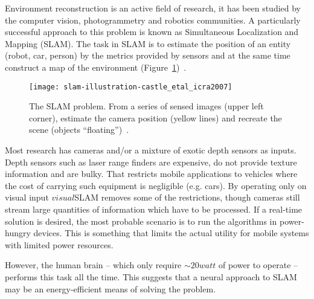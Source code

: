 Environment reconstruction is an active field of research, it has been studied by the computer vision, photogrammetry and robotics communities. A particularly successful approach to this problem is known as Simultaneous Localization and Mapping (SLAM). The task in SLAM is to estimate the position of an entity (robot, car, person) by the metrics provided by sensors and at the same time construct a map of the environment (Figure~\ref{fig:intro:slam})~\cite{Thrun2008_SLAM}.\\[0.1em]

\begin{figure}[hb]
  \begin{center}
    \texttt{[image: slam-illustration-castle\_etal\_icra2007]}
    \caption{The SLAM problem. From a series of sensed images (upper left corner), estimate the camera position (yellow lines) and recreate the scene (objects ``floating'')~\cite{slam-oxford-images}.}
    \label{fig:intro:slam}
  \end{center}
\end{figure}

Most research has cameras and/or a mixture of exotic depth sensors as inputs.
Depth sensors such as laser range finders are expensive, do not provide texture information and are bulky. That restricts mobile applications to vehicles where the cost of carrying such equipment is negligible (e.g. cars).
By operating only on visual input $visual$SLAM removes some of the restrictions, though cameras still stream large quantities of information which have to be processed. If a real-time solution is desired, the most probable scenario is to run the algorithms in power-hungry devices. This is something that limits the actual utility for mobile systems with limited power resources. 

However, the human brain -- which only require $\sim 20 watt$ of power to operate -- performs this task all the time. This suggests that a neural approach to SLAM may be an energy-efficient means of solving the problem.

